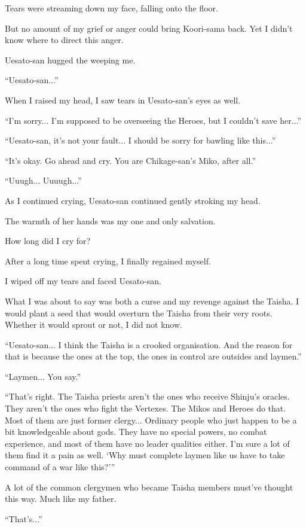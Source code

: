 Tears were streaming down my face, falling onto the floor.

But no amount of my grief or anger could bring Koori-sama back. Yet I didn't know where to direct this anger.

Uesato-san hugged the weeping me.

``Uesato-san...''

When I raised my head, I saw tears in Uesato-san's eyes as well.

``I'm sorry... I'm supposed to be overseeing the Heroes, but I couldn't save her...''

``Uesato-san, it's not your fault... I should be sorry for bawling like this...''

``It's okay. Go ahead and cry. You are Chikage-san's Miko, after all.''

``Uuugh... Uuuugh...''

As I continued crying, Uesato-san continued gently stroking my head.

The warmth of her hands was my one and only salvation.

How long did I cry for?

After a long time spent crying, I finally regained myself.

I wiped off my tears and faced Uesato-san.

What I was about to say was both a curse and my revenge against the Taisha. I would plant a seed that would overturn the Taisha from their very roots. Whether it would sprout or not, I did not know.

``Uesato-san... I think the Taisha is a crooked organisation. And the reason for that is because the ones at the top, the ones in control are outsides and laymen.''

``Laymen... You say.''

``That's right. The Taisha priests aren't the ones who receive Shinju's oracles. They aren't the ones who fight the Vertexes. The Mikos and Heroes do that. Most of them are just former clergy... Ordinary people who just happen to be a bit knowledgeable about gods. They have no special powers, no combat experience, and most of them have no leader qualities either. I'm sure a lot of them find it a pain as well. `Why must complete laymen like us have to take command of a war like this?'''

A lot of the common clergymen who became Taisha members must've thought this way. Much like my father.

``That's...''

